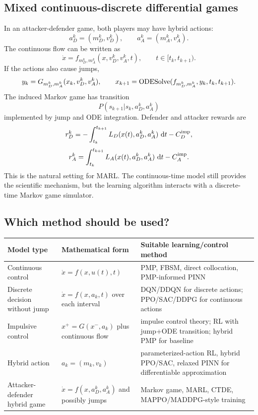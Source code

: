 \documentclass[11pt,a4paper]{article}
\begin{document}
\subsection{Mixed continuous-discrete differential games}
In an attacker-defender game, both players may have hybrid actions:
\begin{equation}
    a_D^k=(m_D^k,v_D^k),\qquad a_A^k=(m_A^k,v_A^k).
\end{equation}
The continuous flow can be written as
\begin{equation}
    \dot{x}=f_{m_D^k,m_A^k}(x,v_D^k,v_A^k,t),\qquad t\in[t_k,t_{k+1}).
\end{equation}
If the actions also cause jumps,
\begin{equation}
    y_k=G_{m_D^k,m_A^k}(x_k,v_D^k,v_A^k),\qquad
    x_{k+1}=\operatorname{ODESolve}(f_{m_D^k,m_A^k},y_k,t_k,t_{k+1}).
\end{equation}
The induced Markov game has transition
\begin{equation}
    P(s_{k+1}|s_k,a_D^k,a_A^k)
\end{equation}
implemented by jump and ODE integration. Defender and attacker rewards are
\begin{equation}
    r_D^k=-\int_{t_k}^{t_{k+1}}L_D(x(t),a_D^k,a_A^k)\,\,\mathrm{d} t-C_D^{\rm imp},
\end{equation}
\begin{equation}
    r_A^k=\int_{t_k}^{t_{k+1}}L_A(x(t),a_D^k,a_A^k)\,\,\mathrm{d} t-C_A^{\rm imp}.
\end{equation}
This is the natural setting for MARL. The continuous-time model still provides the scientific mechanism, but the learning algorithm interacts with a discrete-time Markov game simulator.

\subsection{Which method should be used?}
\begin{longtable}{p{}p{}p{}}
\toprule
Model type & Mathematical form & Suitable learning/control method \\
\midrule
Continuous control & $\dot{x}=f(x,u(t),t)$ & PMP, FBSM, direct collocation, PMP-informed PINN \\
Discrete decision without jump & $\dot{x}=f(x,a_k,t)$ over each interval & DQN/DDQN for discrete actions; PPO/SAC/DDPG for continuous actions \\
Impulsive control & $x^+=G(x^-,a_k)$ plus continuous flow & impulse control theory; RL with jump+ODE transition; hybrid PMP for baseline \\
Hybrid action & $a_k=(m_k,v_k)$ & parameterized-action RL, hybrid PPO/SAC, relaxed PINN for differentiable approximation \\
Attacker-defender hybrid game & $\dot{x}=f(x,a_D^k,a_A^k)$ and possibly jumps & Markov game, MARL, CTDE, MAPPO/MADDPG-style training \\
\bottomrule
\end{longtable}
\end{document}
